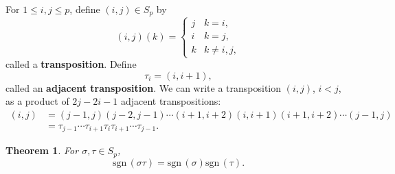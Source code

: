 \documentclass{article}
\newcommand{\sgn}{\mathrm{sgn}\,}
\newtheorem{theorem}{Theorem}
\theoremstyle{definition}
\begin{document}
For $1 \leq i, j \leq p$, define $(i,j) \in S_p$ by
\[
(i,j)(k) = \begin{cases}
j&k=i,\\
i&k=j,\\
k&k \neq i,j,
\end{cases}
\]
called a \textbf{transposition}.
Define
\[
\tau_i = (i,i+1),
\]
called an \textbf{adjacent transposition}.
We can write a transposition $(i,j)$, $i<j$, as a product of $2j-2i-1$ adjacent transpositions:
\begin{align*}
(i,j) & = (j-1,j)(j-2,j-1)\cdots(i+1,i+2)(i,i+1)(i+1,i+2)\cdots(j-1,j)\\
&=\tau_{j-1} \cdots \tau_{i+1} \tau_i \tau_{i+1} \cdots \tau_{j-1}.
\end{align*}

\begin{theorem}
For $\sigma,\tau \in S_p$,
\[
\sgn(\sigma \tau) = \sgn(\sigma) \sgn(\tau).
\]
\label{sgnhomo}
\end{theorem}
\end{document}

